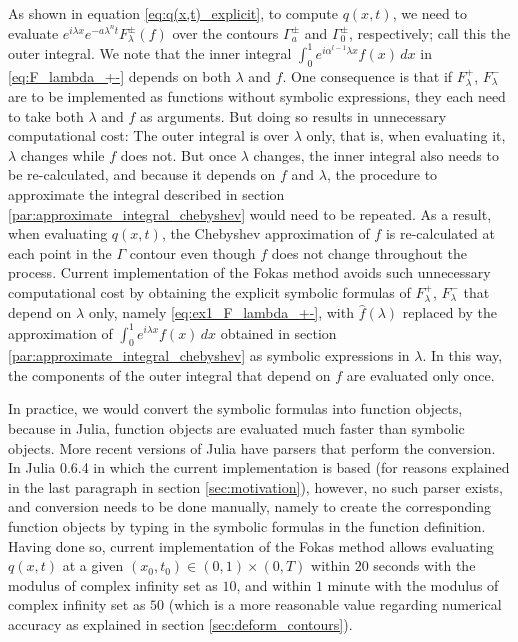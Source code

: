 \documentclass[12pt, oneside, a4paper]{article}
\begin{document}
As shown in equation \eqref{eq:q(x,t)_explicit}, to compute $q(x,t)$, we need to evaluate $e^{i\lambda x}e^{-a\lambda^n t}F_\lambda^\pm(f)$ over the contours $\Gamma_a^\pm$ and $\Gamma_0^\pm$, respectively; call this the outer integral. We note that the inner integral $\int_0^1 e^{i\alpha^{l-1}\lambda x}f(x)\,dx$ in \eqref{eq:F_lambda_+-} depends on both $\lambda$ and $f$. One consequence is that if $F_\lambda^+$, $F_\lambda^-$ are to be implemented as functions without symbolic expressions, they each need to take both $\lambda$ and $f$ as arguments. But doing so results in unnecessary computational cost: The outer integral is over $\lambda$ only, that is, when evaluating it, $\lambda$ changes while $f$ does not. But once $\lambda$ changes, the inner integral also needs to be re-calculated, and because it depends on $f$ and $\lambda$, the procedure to approximate the integral described in section \ref{par:approximate_integral_chebyshev} would need to be repeated. As a result, when evaluating $q(x,t)$, the Chebyshev approximation of $f$ is re-calculated at each point in the $\Gamma$ contour even though $f$ does not change throughout the process. Current implementation of the Fokas method avoids such unnecessary computational cost by obtaining the explicit symbolic formulas of $F_\lambda^+$, $F_\lambda^-$ that depend on $\lambda$ only, namely \eqref{eq:ex1_F_lambda_+-}, with $\hat{f}(\lambda)$ replaced by the approximation of $\int_0^1 e^{i\lambda x}f(x)\,dx$ obtained in section \ref{par:approximate_integral_chebyshev} as symbolic expressions in $\lambda$. In this way, the components of the outer integral that depend on $f$ are evaluated only once.

In practice, we would convert the symbolic formulas into function objects, because in Julia, function objects are evaluated much faster than symbolic objects. More recent versions of Julia have parsers that perform the conversion. In Julia 0.6.4 in which the current implementation is based (for reasons explained in the last paragraph in section \ref{sec:motivation}), however, no such parser exists, and conversion needs to be done manually, namely to create the corresponding function objects by typing in the symbolic formulas in the function definition. Having done so, current implementation of the Fokas method allows evaluating $q(x,t)$ at a given $(x_0, t_0)\in (0,1)\times (0,T)$ within $20$ seconds with the modulus of complex infinity set as $10$, and within $1$ minute with the modulus of complex infinity set as $50$ (which is a more reasonable value regarding numerical accuracy as explained in section \ref{sec:deform_contours}).
\end{document}
